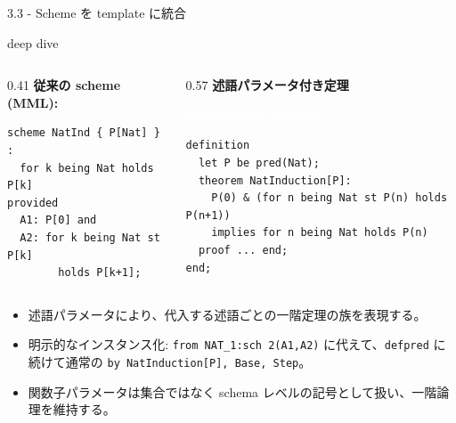 \documentclass[dvipdfmx,aspectratio=169,11pt]{beamer}
\newcommand{\statusbadge}[2]{\colorbox{#1}{\textcolor{white}{\strut\scriptsize\sffamily\bfseries #2}}}
\newcommand{\badgeSpec}{\statusbadge{green!35!black}{specification example}}
\newcommand{\deepdivetag}{\hfill\colorbox{black!15}{\textcolor{black!65}{\strut\scriptsize\sffamily deep dive}}}
\begin{document}
\begin{frame}[fragile,t]{3.3 - Scheme を template に統合\deepdivetag}
\begin{columns}[T,onlytextwidth]
\begin{column}{0.41\textwidth}
\smallskip
\textbf{従来の scheme (MML):}
\begin{lstlisting}[language={mizar},basicstyle=\ttfamily\footnotesize]
scheme NatInd { P[Nat] } :
  for k being Nat holds P[k]
provided
  A1: P[0] and
  A2: for k being Nat st P[k]
        holds P[k+1];
\end{lstlisting}
\end{column}
\begin{column}{0.57\textwidth}
\smallskip
\textbf{述語パラメータ付き定理}~\badgeSpec
\begin{lstlisting}[language={mizar},basicstyle=\ttfamily\footnotesize]
definition
  let P be pred(Nat);
  theorem NatInduction[P]:
    P(0) & (for n being Nat st P(n) holds P(n+1))
    implies for n being Nat holds P(n)
  proof ... end;
end;
\end{lstlisting}
\end{column}
\end{columns}
\smallskip
\begin{itemize}
\setlength{\itemsep}{1pt}
\setlength{\parsep}{0pt}
\setlength{\parskip}{0pt}
\item 述語パラメータにより、代入する述語ごとの一階定理の族を表現する。\footnotemark[1]
\item 明示的なインスタンス化: \texttt{from NAT\_1:sch 2(A1,A2)} に代えて、\texttt{defpred} に続けて通常の \texttt{by NatInduction[P], Base, Step}。
\item 関数子パラメータは集合ではなく schema レベルの記号として扱い、一階論理を維持する。
\end{itemize}
\end{frame}
\end{document}
